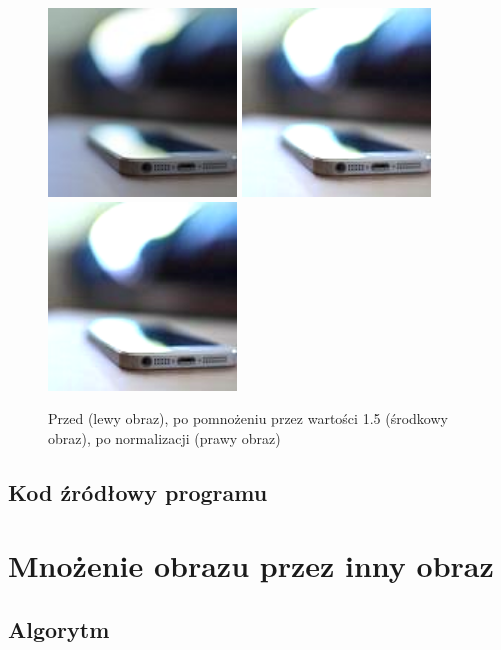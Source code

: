 \documentclass[a4paper,12pt]{book}
\begin{document}
\begin{figure}[H]
	\caption{Przed (lewy obraz), po pomnożeniu przez wartości 1.5 (środkowy obraz), po normalizacji (prawy obraz)}
	\includegraphics[width=5cm, height=5cm]{phone-unmodified.jpg}
	\includegraphics[width=5cm, height=5cm]{3-2/multiply-color-const-phone-15.png}
	\includegraphics[width=5cm, height=5cm]{3-2/multiply-color-const-phone-15-norm.png}
\end{figure}

\subsection*{Kod źródłowy programu}

\section{Mnożenie obrazu przez inny obraz}
\subsection*{Algorytm}
\end{document}
